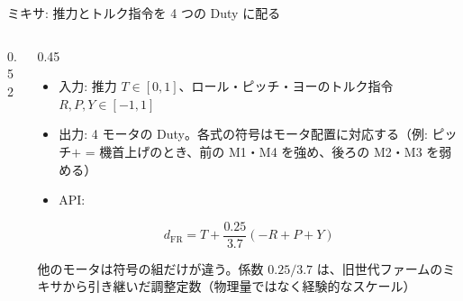\begin{frame}{ミキサ: 推力とトルク指令を 4 つの Duty に配る}
  \begin{columns}[T]
    \begin{column}{0.52\textwidth}
      \centering
    \end{column}
    \begin{column}{0.45\textwidth}
      \footnotesize
      \begin{itemize}\setlength{\itemsep}{3pt}
        \item 入力: 推力 $T\in[0,1]$、ロール・ピッチ・ヨーのトルク指令 $R,P,Y\in[-1,1]$
        \item 出力: 4 モータの Duty。各式の符号はモータ配置に対応する（例: ピッチ$+$ = 機首上げのとき、前の M1・M4 を強め、後ろの M2・M3 を弱める）
        \item API: 
      \end{itemize}
      \vspace{0.1em}
      \[
        d_{\mathrm{FR}} = T + \frac{0.25}{3.7}(-R + P + Y)
      \]
      {\scriptsize 他のモータは符号の組だけが違う。係数 $0.25/3.7$ は、旧世代ファームのミキサから引き継いだ調整定数（物理量ではなく経験的なスケール）\par}
    \end{column}
  \end{columns}
\end{frame}

